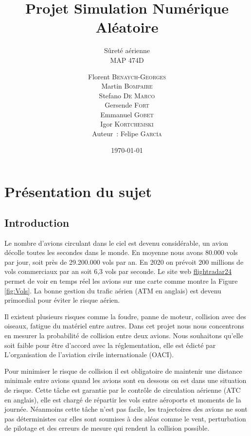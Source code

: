 \documentclass[a4paper, 12pt,twoside]{article}
\title{Projet Simulation Numérique Aléatoire}
\subtitle{Sûreté aérienne \\ MAP 474D}
\author{Florent  \textsc{Benaych-Georges} \\
		Martin \textsc{Bompaire} \\
		Stefano \textsc{De Marco} \\
		Gersende \textsc{Fort} \\
		Emmanuel \textsc{Gobet} \\
		Igor \textsc{Kortchemski} \\
		\vspace{2ex}
		Auteur~: Felipe \textsc{García} \\
		}
\date\today
\numberwithin{equation}{subsection}
\begin{document}
    \maketitle
    \renewcommand{\baselinestretch}{1.1}
    \setlength{\parskip}{0.5em}
	
    \tableofcontents
    \clearpage
	
    \section{Présentation du sujet} %
    \label{sec:presentation_du_sujet}
	
	\subsection{Introduction} %
	\label{sub:introduction}
	
	Le nombre d'avions circulant dans le ciel est devenu considérable, un avion décolle toutes les secondes dans le monde. En moyenne nous avons 80.000 vols par jour, soit près de 29.200.000 vols par an. En 2020 on prévoit 200 millions de vols commerciaux par an soit 6,3 vols par seconde. Le site web \href{https://www.flightradar24.com}{flightradar24} permet de voir en temps réel les avions sur une carte comme montre la Figure \ref{fig:Vols}. La bonne gestion du trafic aérien (ATM en anglais) est devenu primordial pour éviter le risque aérien.
	
	Il existent plusieurs risques comme la foudre, panne de moteur, collision avec des oiseaux, fatigue du matériel entre autres. Dans cet projet nous nous concentrons en mesurer la probabilité de collision entre deux avions. Nous souhaitons qu'elle soit faible pour être d'accord avec la réglementation, elle est édicté par L'organisation de l'aviation civile internationale (OACI).
	
	Pour minimiser le risque de collision il est obligatoire de maintenir une distance minimale entre avions quand les avions sont en dessous on est dans une situation de risque. Cette tâche est garantie par le contrôle de circulation aérienne (ATC en anglais), elle est chargé de répartir les vols entre aéroports et moments de la journée. Néanmoins cette tâche n'est pas facile, les trajectoires des avions ne sont pas déterministes car elles sont soumises à des aléas comme le vent, perturbation de pilotage et des erreurs de mesure qui rendent la collision possible.
	
\end{document}
